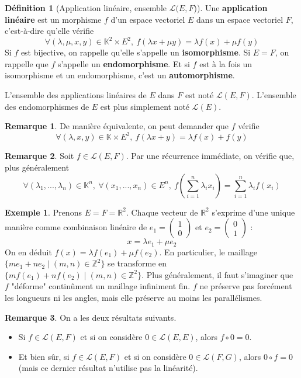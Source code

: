 \documentclass[french]{book}
\theoremstyle{plain}
\theoremstyle{definition}
\newtheorem{dfn}{Définition}[chapter]
\newtheorem{exa}{Exemple}[chapter]
\newtheorem{rmq}{Remarque}[chapter]
\theoremstyle{remark}
\begin{document}
\begin{dfn}[Application linéaire, ensemble $\mathcal{L}(E,F$)]
	Une \textbf{application linéaire} est un morphisme $f$ d'un espace vectoriel $E$ dans un espace vectoriel $F$, c'est-à-dire qu'elle vérifie	$$\forall (\lambda, \mu, x, y) \in \mathbb{K}^2 \times E^2,\ f(\lambda x + \mu y) = \lambda f(x) + \mu f(y)$$
	Si $f$ est bijective, on rappelle qu'elle s'appelle un \textbf{isomorphisme}. Si $E = F$, on rappelle que $f$ s'appelle un \textbf{endomorphisme}. Et si $f$ est à la fois un isomorphisme et un endomorphisme, c'est un \textbf{automorphisme}. \par L'ensemble des applications linéaires de $E$ dans $F$ est noté $\mathcal{L}(E,F)$. L'ensemble des endomorphismes de $E$ est plus simplement noté $\mathcal{L}(E)$.
\end{dfn}
\begin{rmq}
	De manière équivalente, on peut demander que $f$ vérifie $$\forall (\lambda, x, y) \in \mathbb{K} \times E^2,\ f(\lambda x + y) = \lambda f(x) + f(y)$$
\end{rmq}
\begin{rmq}
	Soit $f \in \mathcal{L}(E,F)$. Par une récurrence immédiate, on vérifie que, plus généralement $$\forall (\lambda_1, ..., \lambda_n) \in \mathbb{K}^n,\ \forall (x_1, ..., x_n) \in E^n,\ f\left(\sum_{i=1}^n \lambda_i x_i\right) = \sum_{i=1}^n \lambda_i f(x_i)$$
\end{rmq}
\begin{exa}
	Prenons $E = F = \mathbb{R}^2$. Chaque vecteur de $\mathbb{R}^2$ s'exprime d'une unique manière comme combinaison linéaire de $e_1 = \begin{pmatrix} 1 \\ 0 \end{pmatrix}$ et $\displaystyle e_2 = \begin{pmatrix} 0 \\ 1 \end{pmatrix}$ : $$x=\lambda e_1+\mu e_2$$
	On en déduit $f(x) = \lambda f(e_1) + \mu f(e_2)$. En particulier, le maillage $\{me_1 + ne_2 \mid (m,n) \in \mathbb{Z}^2\}$ se transforme en $\{mf(e_1) + nf(e_2) \mid (m,n) \in \mathbb{Z}^2\}$. Plus généralement, il faut s'imaginer que $f$ "déforme" continûment un maillage infiniment fin. $f$ ne préserve pas forcément les longueurs ni les angles, mais elle préserve au moins les parallélismes.
\end{exa}
\begin{rmq}
	On a les deux résultats suivants.
	\begin{itemize}
		\item Si $f \in \mathcal{L}(E, F)$ et si on considère $0 \in \mathcal{L}(E, E)$, alors $f \circ 0 = 0$.
		\item Et bien sûr, si $f \in \mathcal{L}(E, F)$ et si on considère $0 \in \mathcal{L}(F, G)$, alors $0 \circ f = 0$ (mais ce dernier résultat n'utilise pas la linéarité).
	\end{itemize}	
\end{rmq}
\end{document}
